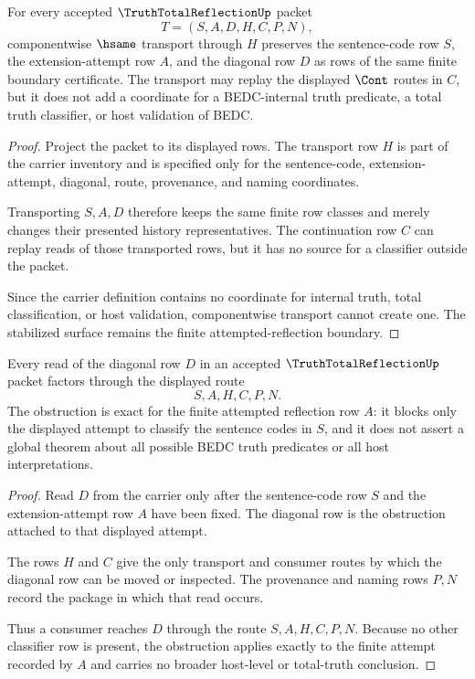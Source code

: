 \begin{theorem}
\label{thm:truth-total-reflection-attempt-row-stability}
For every accepted $\TruthTotalReflectionUp$ packet
$$
T=(S,A,D,H,C,P,N),
$$
componentwise $\hsame$ transport through $H$ preserves the sentence-code row $S$, the extension-attempt row $A$, and the diagonal row $D$ as rows of the same finite boundary certificate. The transport may replay the displayed $\Cont$ routes in $C$, but it does not add a coordinate for a BEDC-internal truth predicate, a total truth classifier, or host validation of BEDC.
\end{theorem}
\begin{proof}
Project the packet to its displayed rows. The transport row $H$ is part of the carrier inventory and is specified only for the sentence-code, extension-attempt, diagonal, route, provenance, and naming coordinates.

Transporting $S,A,D$ therefore keeps the same finite row classes and merely changes their presented history representatives. The continuation row $C$ can replay reads of those transported rows, but it has no source for a classifier outside the packet.

Since the carrier definition contains no coordinate for internal truth, total classification, or host validation, componentwise transport cannot create one. The stabilized surface remains the finite attempted-reflection boundary.
\end{proof}

\begin{theorem}
\label{thm:truth-total-reflection-diagonal-obstruction-exactness}
Every read of the diagonal row $D$ in an accepted $\TruthTotalReflectionUp$ packet factors through the displayed route
$$
S,A,H,C,P,N.
$$
The obstruction is exact for the finite attempted reflection row $A$: it blocks only the displayed attempt to classify the sentence codes in $S$, and it does not assert a global theorem about all possible BEDC truth predicates or all host interpretations.
\end{theorem}
\begin{proof}
Read $D$ from the carrier only after the sentence-code row $S$ and the extension-attempt row $A$ have been fixed. The diagonal row is the obstruction attached to that displayed attempt.

The rows $H$ and $C$ give the only transport and consumer routes by which the diagonal row can be moved or inspected. The provenance and naming rows $P,N$ record the package in which that read occurs.

Thus a consumer reaches $D$ through the route $S,A,H,C,P,N$. Because no other classifier row is present, the obstruction applies exactly to the finite attempt recorded by $A$ and carries no broader host-level or total-truth conclusion.
\end{proof}

